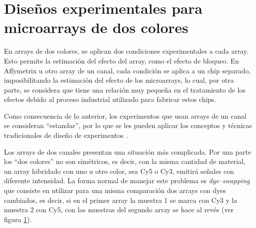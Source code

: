 \section{Dise\~nos experimentales para microarrays de dos colores}

En arrays de dos colores, se aplican dos condiciones experimentales a cada array.
Esto permite la estimaci\'on del efecto del array, como el efecto de bloqueo.
En Affymetrix u otro array de un canal, cada condici\'on se aplica a un
chip separado, imposibilitando la estimaci\'on del efecto de los microarrays, lo
cual, por otra parte, se considera que tiene una relaci\'on muy peque\~na en el
tratamiento de los efectos debido al proceso industrial utilizado para fabricar
estos chips.

Como consecuencia de lo anterior, los experimentos que usan arrays de un canal
se consideran ``estandar'', por lo que se les pueden aplicar los conceptos y t\'ecnicas tradicionales de
dise\~no de experimentos .


Los arrays de dos canales presentan una situaci\'on m\'as complicada. Por una parte los
``dos colores'' no son sim\'etricos, es decir, con la misma cantidad de material,
un array hibridado con uno u otro color, sea Cy5 o Cy3, emitir\'a se\~nales con
diferente intensidad. La forma normal de manejar este problema es
 \emph{dye--swapping} que consiste en utilizar para una misma comparaci\'on dos
arrays con dyes cambiados, es decir, si en el primer array la muestra 1 se marca
con Cy3 y la muestra 2 con Cy5, con las muestras del segundo array se hace al
rev\'es (ver figura \ref{c04dyelabels}).



\vspace{-0.5cm}
\begin{figure}[!h]
\label{c04dyelabels}
\end{figure}


